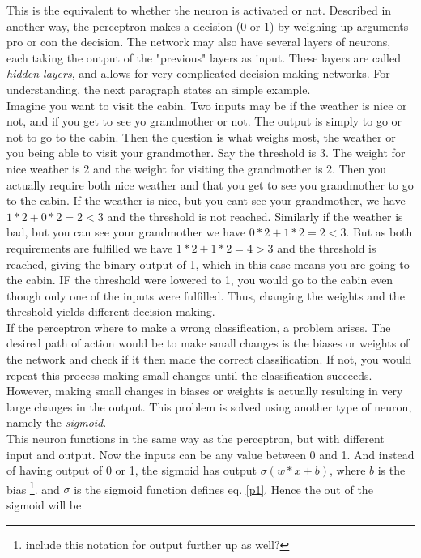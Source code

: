 \documentclass[a4paper,11pt,twocolumn]{article}
\begin{document}
This is the equivalent to whether the neuron is activated or not. Described in another way, the perceptron makes a decision (0 or 1) by weighing up arguments pro or con the decision. The network may also have several layers of neurons, each taking the output of the "previous" layers as input. These layers are called \textit{hidden layers}, and allows for very complicated decision making networks. For understanding, the next paragraph states an simple example.
\\ 

Imagine you want to visit the cabin. Two inputs may be if the weather is nice or not, and if you get to see yo grandmother or not. The output is simply to go or not to go to the cabin. Then the question is what weighs most, the weather or you being able to visit your grandmother. Say the threshold is 3. The weight for nice weather is 2 and the weight for visiting the grandmother is 2. Then you actually require both nice weather and that you get to see you grandmother to go to the cabin. If the weather is nice, but you cant see your grandmother, we have $1*2 + 0*2 = 2 < 3$ and the threshold is not reached. Similarly if the weather is bad, but you can see your grandmother we have $0*2 + 1*2 = 2 < 3$. But as both requirements are fulfilled we have $1*2 + 1*2 = 4 > 3$ and the threshold is reached, giving the binary output of 1, which in this case means you are going to the cabin. IF the threshold were lowered to 1, you would go to the cabin even though only one of the inputs were fulfilled. Thus, changing the weights and the threshold yields different decision making. 
\\

If the perceptron where to make a wrong classification, a problem arises. The desired path of action would be to make small changes is the biases or weights of the network and check if it then made the correct classification. If not, you would repeat this process making small changes until the classification succeeds. However, making small changes in biases or weights is actually resulting in very large changes in the output. This problem is solved using another type of neuron, namely the \textit{sigmoid}. 
\\

This neuron functions in the same way as the perceptron, but with different input and output. Now the inputs can be any value between 0 and 1. And instead of having output of 0 or 1, the sigmoid has output $\sigma(w*x + b)$, where $b$ is the bias \footnote{include this notation for output further up as well?}. and $\sigma$ is the sigmoid function defines eq. \eqref{p1}. Hence the out of the sigmoid will be 
\end{document}

